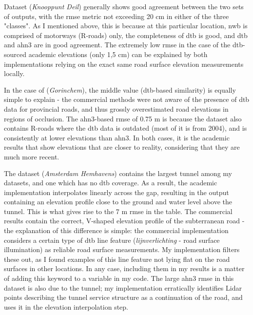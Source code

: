 Dataset  (\textit{Knooppunt Deil}) generally shows good agreement between the two sets of outputs, with the \ac{rmse} metric not exceeding 20 cm in either of the three "classes". As I mentioned above, this is because at this particular location, \ac{nwb} is comprised of motorways (R-roads) only, the completeness of \ac{dtb} is good, and \ac{dtb} and \ac{ahn3} are in good agreement. The extremely low \ac{rmse} in the case of the \ac{dtb}-sourced academic elevations (only 1,5 cm) can be explained by both implementations relying on the exact same road surface elevation measurements locally.

In the case of  (\textit{Gorinchem}), the middle value (\ac{dtb}-based similarity) is equally simple to explain - the commercial methods were not aware of the presence of \ac{dtb} data for provincial roads, and thus grossly overestimated road elevations in regions of occlusion. The \ac{ahn3}-based \ac{rmse} of 0.75 m is because the dataset also contains R-roads where the \ac{dtb} data is outdated (most of it is from 2004), and is consistently at lower elevations than \ac{ahn3}. In both cases, it is the academic results that show elevations that are closer to reality, considering that they are much more recent.

The dataset  (\textit{Amsterdam Hemhavens}) contains the largest tunnel among my datasets, and one which has no \ac{dtb} coverage. As a result, the academic implementation interpolates linearly across the gap, resulting in the output containing an elevation profile close to the ground and water level above the tunnel. This is what gives rise to the 7 m \ac{rmse} in the table. The commercial results contain the correct, V-shaped elevation profile of the subterranean road - the explanation of this difference is simple: the commercial implementation considers a certain type of \ac{dtb} line feature (\textit{lijnverlichting} - road surface illumination) as reliable road surface measurements. My implementation filters these out, as I found examples of this line feature not lying flat on the road surfaces in other locations. In any case, including them in my results is a matter of adding this keyword to a variable in my code. The large \ac{ahn3} \ac{rmse} in this dataset is also due to the tunnel; my implementation erratically identifies Lidar points describing the tunnel service structure as a continuation of the road, and uses it in the elevation interpolation step.

